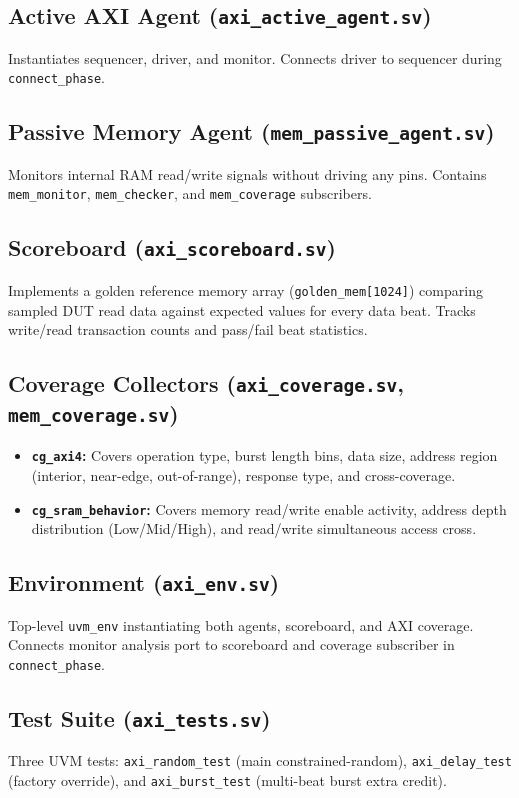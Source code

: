 \documentclass[10pt,a4paper]{article}
\begin{document}
\subsection{Active AXI Agent (\texttt{axi\_active\_agent.sv})}
Instantiates sequencer, driver, and monitor. Connects driver to sequencer during \texttt{connect\_phase}.

\subsection{Passive Memory Agent (\texttt{mem\_passive\_agent.sv})}
Monitors internal RAM read/write signals without driving any pins. Contains \texttt{mem\_monitor}, \texttt{mem\_checker}, and \texttt{mem\_coverage} subscribers.

\subsection{Scoreboard (\texttt{axi\_scoreboard.sv})}
Implements a golden reference memory array (\texttt{golden\_mem[1024]}) comparing sampled DUT read data against expected values for every data beat. Tracks write/read transaction counts and pass/fail beat statistics.

\subsection{Coverage Collectors (\texttt{axi\_coverage.sv}, \texttt{mem\_coverage.sv})}
\begin{itemize}
    \item \textbf{\texttt{cg\_axi4}:} Covers operation type, burst length bins, data size, address region (interior, near-edge, out-of-range), response type, and cross-coverage.
    \item \textbf{\texttt{cg\_sram\_behavior}:} Covers memory read/write enable activity, address depth distribution (Low/Mid/High), and read/write simultaneous access cross.
\end{itemize}

\subsection{Environment (\texttt{axi\_env.sv})}
Top-level \texttt{uvm\_env} instantiating both agents, scoreboard, and AXI coverage. Connects monitor analysis port to scoreboard and coverage subscriber in \texttt{connect\_phase}.

\subsection{Test Suite (\texttt{axi\_tests.sv})}
Three UVM tests: \texttt{axi\_random\_test} (main constrained-random), \texttt{axi\_delay\_test} (factory override), and \texttt{axi\_burst\_test} (multi-beat burst extra credit).
\end{document}
